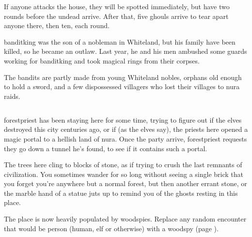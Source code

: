 \begin{multicols}{2}
If anyone attacks the house, they will be spotted immediately, but have two rounds before the undead arrive.
After that, five ghouls arrive to tear apart anyone there, then ten, each round.

\banditking

\Gls{banditking} was the son of a nobleman in Whiteland, but his family have been killed, so he became an outlaw.
Last year, he and his men ambushed some guards working for \gls{banditking} and took magical rings from their corpses.

The bandits are partly made from young Whiteland nobles, orphans old enough to hold a sword, and a few dispossessed villagers who lost their villages to nura raids.


\subsection{}\label{lostcity}\setcounter{list}{0}

\Gls{forestpriest} has been staying here for some time, trying to figure out if the elves destroyed this city centuries ago, or if (as the elves say), the priests here opened a magic portal to a hellish land of nura.
Once the party arrive, \gls{forestpriest} requests they go down a tunnel he's found, to see if it contains such a portal.

\begin{boxtext}

The trees here cling to blocks of stone, as if trying to crush the last remnants of civilization.  You sometimes wander for so long without seeing a single brick that you forget you're anywhere but a normal forest, but then another errant stone, or the marble hand of a statue juts up to remind you of the ghosts resting in this place.

\end{boxtext}

The place is now heavily populated by woodspies.  Replace any random encounter that would be person (human, elf or otherwise) with a woodspy (page \pageref{woodspy}).

\end{multicols}

\label{lost_city_map}

